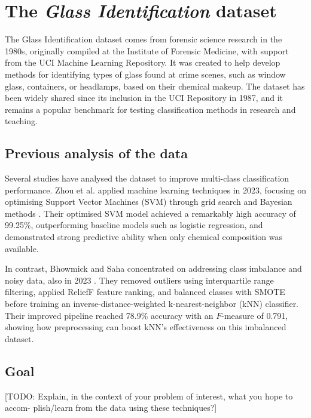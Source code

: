 \documentclass[dtu]{dtuarticle}
\newcommand{\todo}[1]{\color{red}[TODO: #1]\color{black}}
\begin{document}
	\tableofcontents

	\newpage

	\section{The \textit{Glass Identification} dataset}

	The Glass Identification dataset \cite{dataset} comes from forensic science research in the 1980s, originally compiled at the Institute of Forensic Medicine, with support from the UCI Machine Learning Repository. It was created to help develop methods for identifying types of glass found at crime scenes, such as window glass, containers, or headlamps, based on their chemical makeup. The dataset has been widely shared since its inclusion in the UCI Repository in 1987, and it remains a popular benchmark for testing classification methods in research and teaching.

	\subsection{Previous analysis of the data}

	Several studies have analysed the dataset to improve multi-class classification performance. Zhou et al. applied machine learning techniques in 2023, focusing on optimising Support Vector Machines (SVM) through grid search and Bayesian methods \cite{zhou}. Their optimised SVM model achieved a remarkably high accuracy of 99.25\%, outperforming baseline models such as logistic regression, and demonstrated strong predictive ability when only chemical composition was available.

	In contrast, Bhowmick and Saha concentrated on addressing class imbalance and noisy data, also in 2023 \cite{bhowmick}. They removed outliers using interquartile range filtering, applied ReliefF feature ranking, and balanced classes with SMOTE before training an inverse-distance-weighted k-nearest-neighbor (kNN) classifier. Their improved pipeline reached 78.9\% accuracy with an $F$-measure of 0.791, showing how preprocessing can boost kNN’s effectiveness on this imbalanced dataset.

	\subsection{Goal}

	\todo{Explain, in the context of your problem of interest, what you hope to accom-
		plish/learn from the data using these techniques?}
\end{document}
